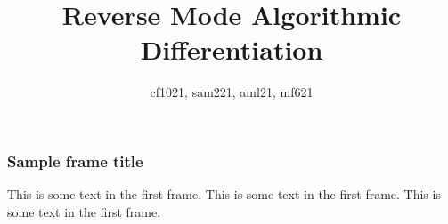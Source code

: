 \documentclass{beamer}
\title{Reverse Mode Algorithmic Differentiation}
\author{cf1021, sam221, aml21, mf621}
\institute{Imperial College London}
\date{}
\begin{document}
\frame{\titlepage}

\begin{frame}
\frametitle{Sample frame title}
This is some text in the first frame. This is some text in the first frame. This is some text in the first frame.
\end{frame}
\end{document}
